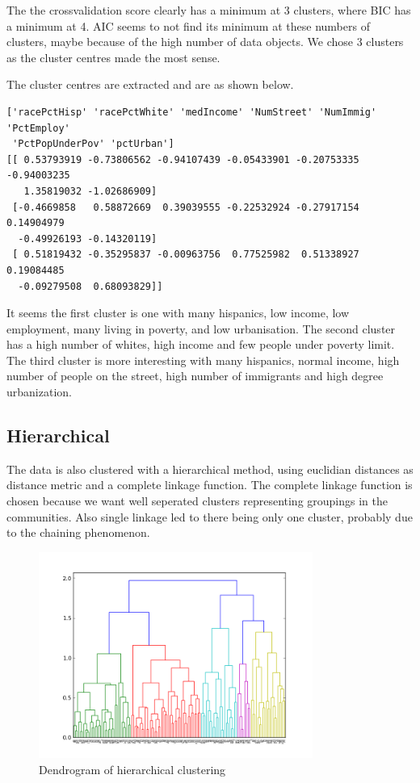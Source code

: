 \documentclass[a4paper,10pt]{article}
\begin{document}
The the crossvalidation score clearly has a minimum at 3 clusters, where BIC has a minimum at 4. AIC seems to not find its minimum at these numbers of clusters, maybe because of the high number of data objects. We chose 3 clusters as the cluster centres made the most sense.

The cluster centres are extracted and are as shown below.
\begin{verbatim}
['racePctHisp' 'racePctWhite' 'medIncome' 'NumStreet' 'NumImmig' 'PctEmploy'
 'PctPopUnderPov' 'pctUrban']
[[ 0.53793919 -0.73806562 -0.94107439 -0.05433901 -0.20753335 -0.94003235
   1.35819032 -1.02686909]
 [-0.4669858   0.58872669  0.39039555 -0.22532924 -0.27917154  0.14904979
  -0.49926193 -0.14320119]
 [ 0.51819432 -0.35295837 -0.00963756  0.77525982  0.51338927  0.19084485
  -0.09279508  0.68093829]]
\end{verbatim}
It seems the first cluster is one with many hispanics, low income, low employment, many living in poverty, and low urbanisation. The second cluster has a high number of whites, high income and few people under poverty limit. The third cluster is more interesting with many hispanics, normal income, high number of people on the street, high number of immigrants and high degree urbanization.

\subsection{Hierarchical}
The data is also clustered with a hierarchical method, using euclidian distances as distance metric and a complete linkage function. The complete linkage function is chosen because we want well seperated clusters representing groupings in the communities. Also single linkage led to there being only one cluster, probably due to the chaining phenomenon.

\begin{figure}[H]
\centering
\includegraphics[h, width=0.8\textwidth]{figure_3}
\caption{Dendrogram of hierarchical clustering}
\end{figure}
\end{document}
